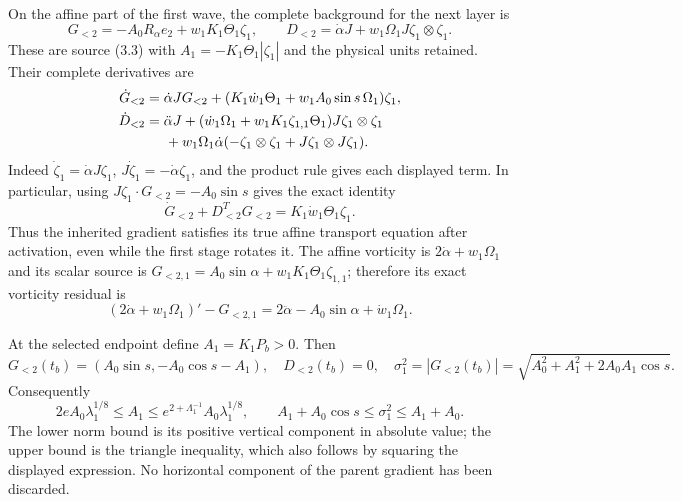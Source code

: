 On the affine part of the first wave, the complete background for the
next layer is
\begin{equation}
 G_{<2}=-A_0R_\alpha e_2+w_1K_1\Theta_1\zeta_1,
 \qquad
 D_{<2}=\dot\alpha J+w_1\Omega_1J\zeta_1\otimes\zeta_1.
 \label{cvlane:eq:cv-first-inherited}
\end{equation}
These are source (3.3) with $A_1=-K_1\Theta_1|\zeta_1|$
and the physical units retained. Their complete derivatives are
\begin{align}
 \dot G_{<2}&=\dot\alpha JG_{<2}
      +(K_1\dot w_1\Theta_1+w_1A_0\sin s\,\Omega_1)\zeta_1,
 \label{cvlane:eq:cv-first-G-derivative}\\
 \dot D_{<2}&=\ddot\alpha J
  +(\dot w_1\Omega_1+w_1K_1\zeta_{1,1}\Theta_1)
                            J\zeta_1\otimes\zeta_1\nonumber\\
 &\hspace{5mm}+w_1\Omega_1\dot\alpha
       (-\zeta_1\otimes\zeta_1+J\zeta_1\otimes J\zeta_1).
 \label{cvlane:eq:cv-first-D-derivative}
\end{align}
Indeed $\dot\zeta_1=\dot\alpha J\zeta_1$,
$J\dot\zeta_1=-\dot\alpha\zeta_1$, and the product rule gives
each displayed term. In particular, using
$J\zeta_1\cdot G_{<2}=-A_0\sin s$ gives the exact identity
\begin{equation}
 \dot G_{<2}+D_{<2}^TG_{<2}=K_1\dot w_1\Theta_1\zeta_1.
 \label{cvlane:eq:cv-first-affine-scalar-residual}
\end{equation}
Thus the inherited gradient satisfies its true affine transport
equation after activation, even while the first stage rotates it.
The affine vorticity is $2\dot\alpha+w_1\Omega_1$ and its scalar
source is $G_{<2,1}=A_0\sin\alpha+w_1K_1\Theta_1\zeta_{1,1}$;
therefore its exact vorticity residual is
\begin{equation}
 (2\dot\alpha+w_1\Omega_1)'-G_{<2,1}
       =2\ddot\alpha-A_0\sin\alpha+\dot w_1\Omega_1.
 \label{cvlane:eq:cv-first-affine-vorticity-residual}
\end{equation}

At the selected endpoint define $A_1=K_1P_b>0$. Then
\begin{equation}
 G_{<2}(t_b)=(A_0\sin s,-A_0\cos s-A_1),\quad D_{<2}(t_b)=0,
 \quad\sigma_1^2=|G_{<2}(t_b)|
   =\sqrt{A_0^2+A_1^2+2A_0A_1\cos s}.
 \label{cvlane:eq:cv-first-exact-sigma}
\end{equation}
Consequently
\[
 2e A_0\lambda_1^{1/8}\leq A_1
 \leq e^{2+\Lambda_1^{-1}}A_0\lambda_1^{1/8},\qquad
 A_1+A_0\cos s\leq\sigma_1^2\leq A_1+A_0.
\]
The lower norm bound is its positive vertical component in absolute
value; the upper bound is the triangle inequality, which also follows
by squaring the displayed expression. No horizontal component of the
parent gradient has been discarded.

